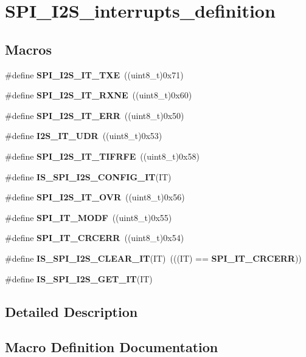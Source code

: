 \section{S\+P\+I\+\_\+\+I2\+S\+\_\+interrupts\+\_\+definition}
\label{group__SPI__I2S__interrupts__definition}
\subsection*{Macros}
\begin{DoxyCompactItemize}
\item 
\#define \textbf{ S\+P\+I\+\_\+\+I2\+S\+\_\+\+I\+T\+\_\+\+T\+XE}~((uint8\+\_\+t)0x71)
\item 
\#define \textbf{ S\+P\+I\+\_\+\+I2\+S\+\_\+\+I\+T\+\_\+\+R\+X\+NE}~((uint8\+\_\+t)0x60)
\item 
\#define \textbf{ S\+P\+I\+\_\+\+I2\+S\+\_\+\+I\+T\+\_\+\+E\+RR}~((uint8\+\_\+t)0x50)
\item 
\#define \textbf{ I2\+S\+\_\+\+I\+T\+\_\+\+U\+DR}~((uint8\+\_\+t)0x53)
\item 
\#define \textbf{ S\+P\+I\+\_\+\+I2\+S\+\_\+\+I\+T\+\_\+\+T\+I\+F\+R\+FE}~((uint8\+\_\+t)0x58)
\item 
\#define \textbf{ I\+S\+\_\+\+S\+P\+I\+\_\+\+I2\+S\+\_\+\+C\+O\+N\+F\+I\+G\+\_\+\+IT}(IT)
\item 
\#define \textbf{ S\+P\+I\+\_\+\+I2\+S\+\_\+\+I\+T\+\_\+\+O\+VR}~((uint8\+\_\+t)0x56)
\item 
\#define \textbf{ S\+P\+I\+\_\+\+I\+T\+\_\+\+M\+O\+DF}~((uint8\+\_\+t)0x55)
\item 
\#define \textbf{ S\+P\+I\+\_\+\+I\+T\+\_\+\+C\+R\+C\+E\+RR}~((uint8\+\_\+t)0x54)
\item 
\#define \textbf{ I\+S\+\_\+\+S\+P\+I\+\_\+\+I2\+S\+\_\+\+C\+L\+E\+A\+R\+\_\+\+IT}(IT)~(((IT) == \textbf{ S\+P\+I\+\_\+\+I\+T\+\_\+\+C\+R\+C\+E\+RR}))
\item 
\#define \textbf{ I\+S\+\_\+\+S\+P\+I\+\_\+\+I2\+S\+\_\+\+G\+E\+T\+\_\+\+IT}(IT)
\end{DoxyCompactItemize}


\subsection{Detailed Description}


\subsection{Macro Definition Documentation}
\mbox{\label{group__SPI__I2S__interrupts__definition_ga54aba7dc06f97fb4839de5f42bd5a47d}} 
